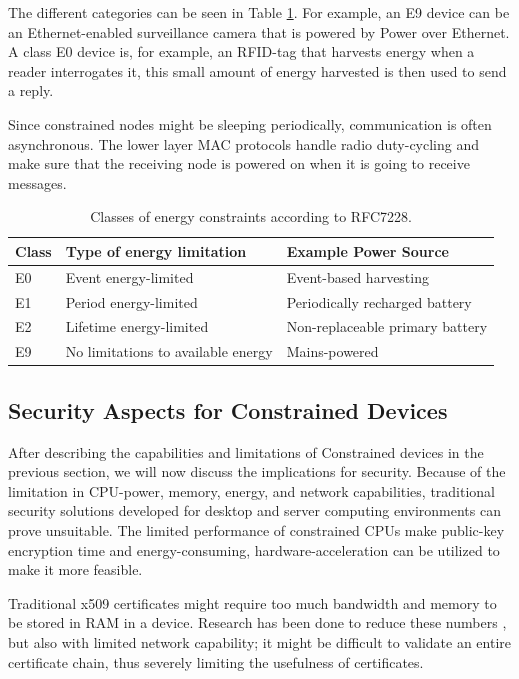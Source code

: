 The different categories can be seen in Table \ref{tab:energy-constraints}. For example, an E9 device can be an Ethernet-enabled surveillance camera that is powered by Power over Ethernet. A class E0 device is, for example, an RFID-tag that harvests energy when a reader interrogates it, this small amount of energy harvested is then used to send a reply. 

Since constrained nodes might be sleeping periodically, communication is often asynchronous. The lower layer MAC protocols handle radio duty-cycling and make sure that the receiving node is powered on when it is going to receive messages.


\begin{table}[h]
\centering
\caption{Classes of energy constraints according to RFC7228.}
\label{tab:energy-constraints}
\begin{tabular}{lll}
\hline\hline
\textbf{Class} & \textbf{Type of energy limitation}  & \textbf{Example Power Source}                               \\ \hline
E0    & Event energy-limited                      & Event-based harvesting                             \\ 
E1    & Period energy-limited                     & Periodically recharged battery                   \\ 
E2    & Lifetime energy-limited                   & Non-replaceable primary battery                    \\ 
E9    & No limitations to available energy           & Mains-powered                                      \\ \hline\hline
\end{tabular}
\end{table}

\subsection{Security Aspects for Constrained Devices}
After describing the capabilities and limitations of Constrained devices in the previous section, we will now discuss the implications for security.
Because of the limitation in CPU-power, memory, energy, and network capabilities, traditional security solutions developed for desktop and server computing environments can prove unsuitable. The limited performance of constrained CPUs make public-key encryption time and energy-consuming, hardware-acceleration can be utilized to make it more feasible.

Traditional x509 certificates might require too much bandwidth and memory to be stored in RAM in a device. Research has been done to reduce these numbers \cite{forsby2017lightweight}, but also with limited network capability; it might be difficult to validate an entire certificate chain, thus severely limiting the usefulness of certificates.

